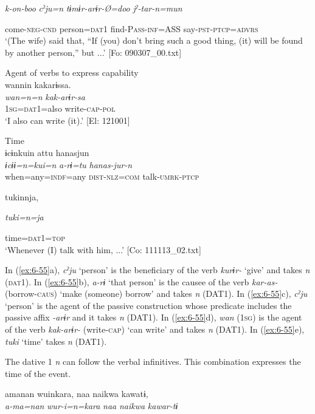 \begin{table}
      \textit{k-on-boo}  \textit{cˀju=n}  \textit{tɨmɨr-arɨr-Ø=doo}  \textit{jˀ-tar-n=mun}

      come-\textsc{neg}-\textsc{cnd}  person=\textsc{dat}1  find-P\textsc{ass}-\textsc{inf}=ASS  say-\textsc{pst}-\textsc{ptcp}=\textsc{advrs}\\
\glt ‘(The wife) said that, “If (you) don’t bring such a good thing, (it) will be found by another person,” but ...’ [Fo: 090307\_00.txt]
\z

\ex Agent of verbs to express capability\\
{\TM}
\glll  wannin  kakarɨssa.\\
\textit{wan=n=n}  \textit{kak-arɨr-sa}\\
1\textsc{sg}=\textsc{dat}1=also  write-\textsc{cap}-\textsc{pol}\\
\glt ‘I also can write (it).’ [El: 121001]

\ex Time\\
{\TM}
\glll  ɨcɨnkuin  attu  hanasjun\\
\textit{ɨcɨɨ=n=kui=n}  \textit{a-rɨ=tu}  \textit{hanas-jur-n}\\
when=any=\textsc{indf}=any  \textsc{dist}-\textsc{nlz}=\textsc{com}  talk-\textsc{umrk}-\textsc{ptcp}

      tukinnja,

      \textit{tuki=n=ja}

      time=\textsc{dat}1=\textsc{top}\\
\glt ‘Whenever (I) talk with him, ...’ [Co: 111113\_02.txt]
\z

In (\ref{ex:6-55}a), \textit{cˀju} ‘person’ is the beneficiary of the verb \textit{kurɨr-} ‘give’ and takes \textit{n} (\textsc{dat}1). In (\ref{ex:6-55}b), \textit{a-rɨ} ‘that person’ is the causee of the verb \textit{kar-as-} (borrow-\textsc{caus}) ‘make (someone) borrow’ and takes \textit{n} (DAT1). In (\ref{ex:6-55}c), \textit{cˀju} ‘person’ is the agent of the passive construction whose predicate includes the passive affix \textit{-arɨr} and it takes \textit{n} (DAT1). In (\ref{ex:6-55}d), \textit{wan} (1\textsc{sg}) is the agent of the verb \textit{kak-arɨr-} (write-\textsc{cap}) ‘can write’ and takes \textit{n} (DAT1). In (\ref{ex:6-55}e), \textit{tuki} ‘time’ takes \textit{n} (DAT1).

  The dative 1 \textit{n} can follow the verbal infinitives. This combination expresses the time of the event.

\ea\label{ex:6-56}
{\TM}
\glll amanan  wuinkara,  naa  naikwa  kawatɨ,\\
\textit{a-ma=nan}  \textit{wur-i=n=kara}  \textit{naa}  \textit{naikwa}  \textit{kawar-tɨ}\\


\end{table}
